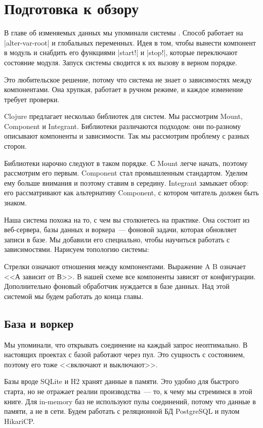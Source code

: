 \section{Подготовка к обзору}

В главе об изменяемых данных мы упоминали системы . Способ
работает на \spverb|alter-var-root| и глобальных переменных. Идея в том, чтобы
вынести компонент в модуль и снабдить его функциями \spverb|start!| и
\spverb|stop!|, которые переключают состояние модуля. Запуск системы сводится к
их вызову в верном порядке.

Это любительское решение, потому что система не знает о зависимостях между
компонентами. Она хрупкая, работает в ручном режиме, и каждое изменение требует
проверки.

Clojure предлагает несколько библиотек для систем. Мы рассмотрим Mount,
Component и Integrant. Библиотеки различаются подходом: они по-разному описывают
компоненты и зависимости. Так мы рассмотрим проблему с разных сторон.

Библиотеки нарочно следуют в таком порядке. С Mount легче начать, поэтому
рассмотрим его первым. Component стал промышленным стандартом. Уделим ему больше
внимания и поэтому ставим в середину. Integrant замыкает обзор: его
рассматривают как альтернативу Component, с котором читатель должен быть знаком.

Наша система похожа на то, с чем вы столкнетесь на практике. Она состоит из
веб-сервера, базы данных и воркера~--- фоновой задачи, которая обновляет записи
в базе. Мы добавили его специально, чтобы научиться работать с
зависимостями. Нарисуем топологию системы:


Стрелки означают отношения между компонентами. Выражение A \arr B означает
<<А зависит от В>>. В нашей схеме все компоненты зависят от конфигурации.
Дополнительно фоновый обработчик нуждается в базе данных. Над этой
системой мы будем работать до конца главы.

\subsection{База и воркер}

Мы упоминали, что открывать соединение на каждый запрос неоптимально. В
настоящих проектах с базой работают через пул. Это сущность с состоянием,
поэтому его тоже <<включают и выключают>>.

Базы вроде SQLite и H2 хранят данные в памяти. Это удобно для быстрого старта,
но не отражает реалии производства~--- то, к чему мы стремимся в этой книге. Для
in-memory баз не используют пулы соединений, потому что данные в памяти, а не в
сети. Будем работать с реляционной БД PostgreSQL и пулом HikariCP.

